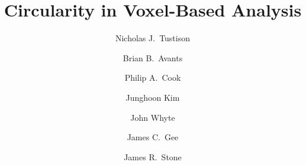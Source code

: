 \documentclass[final,5p,times,twocolumn]{elsarticle}
\begin{document}
\begin{frontmatter}

\title{Circularity in Voxel-Based Analysis}



\author[label1]{Nicholas J.~Tustison}
\author[label2]{Brian B.~Avants}
\author[label2]{Philip A.~Cook}
\author[label3]{Junghoon Kim}
\author[label3]{John Whyte}
\author[label2]{James C.~Gee}
\author[label1]{James R.~Stone}

\address[label1]{Department of Radiology and Medical Imaging, University of Virginia, Charlottesville, VA}
\address[label2]{Penn Image Computing and Science Laboratory, University of Pennsylvania,
                Philadelphia, PA}
\address[label3]{Moss Rehabilitation Research Institute, Albert Einstein Healthcare Network, Philadelphia, PA}







\end{frontmatter}
\end{document}
